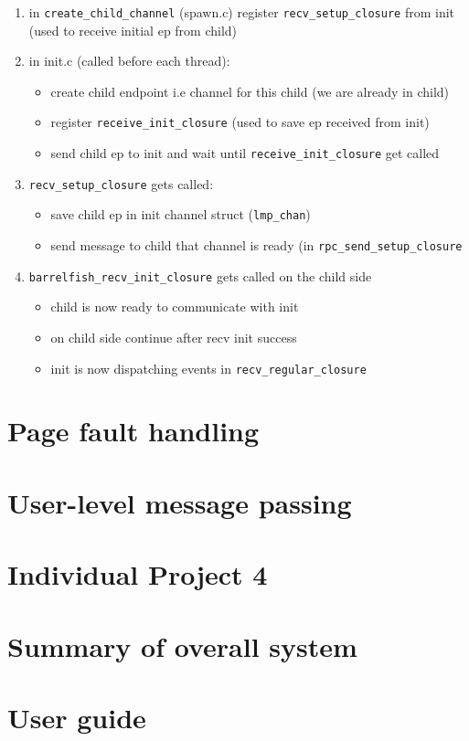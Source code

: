 \documentclass[11pt,a4paper]{report}
\begin{document}
\begin{enumerate}
    \item in \verb|create_child_channel| (spawn.c) register
    \verb|recv_setup_closure| from init
    (used to receive initial ep from child)

    \item in init.c (called before each thread): 
        \begin{itemize}
            \item create child endpoint i.e channel for this child (we are already in child)
            \item register \verb|receive_init_closure| (used to save ep received from init)
            \item send child ep to init and wait until
            \verb|receive_init_closure| get called
        \end{itemize}
    \item \verb|recv_setup_closure| gets called:
        \begin{itemize} 
            \item save child ep in init channel struct (\verb|lmp_chan|)
            \item send message to child that channel is ready (in
            \verb|rpc_send_setup_closure|
        \end{itemize}
    \item \verb|barrelfish_recv_init_closure| gets called on the child side
        \begin{itemize}
            \item child is now ready to communicate with init
            \item on child side continue after recv init success
            \item init is now dispatching events in \verb|recv_regular_closure|
        \end{itemize}
\end{enumerate}

\chapter{Page fault handling}




\chapter{User-level message passing}







\chapter{Individual Project 4}

\chapter{Summary of overall system}

\appendix

\chapter{User guide}

\printbibliography
\end{document}
